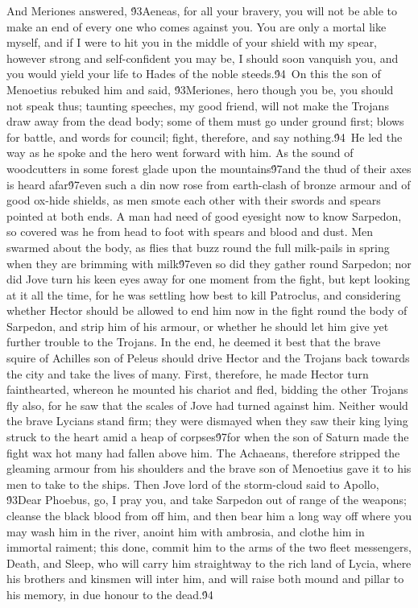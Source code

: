 {And Meriones answered, \'93Aeneas, for all your bravery, you will not be able to make an end of every one who comes against you. You are only a mortal like myself, and if I were to hit you in the middle of your shield with my spear, however strong and self-confident you may be, I should soon vanquish you, and you would yield your life to Hades of the noble steeds.\'94\
On this the son of Menoetius rebuked him and said, \'93Meriones, hero though you be, you should not speak thus; taunting speeches, my good friend, will not make the Trojans draw away from the dead body; some of them must go under ground first; blows for battle, and words for council; fight, therefore, and say nothing.\'94\
He led the way as he spoke and the hero went forward with him. As the sound of woodcutters in some forest glade upon the mountains\'97and the thud of their axes is heard afar\'97even such a din now rose from earth-clash of bronze armour and of good ox-hide shields, as men smote each other with their swords and spears pointed at both ends. A man had need of good eyesight now to know Sarpedon, so covered was he from head to foot with spears and blood and dust. Men swarmed about the body, as flies that buzz round the full milk-pails in spring when they are brimming with milk\'97even so did they gather round Sarpedon; nor did Jove turn his keen eyes away for one moment from the fight, but kept looking at it all the time, for he was settling how best to kill Patroclus, and considering whether Hector should be allowed to end him now in the fight round the body of Sarpedon, and strip him of his armour, or whether he should let him give yet further trouble to the Trojans. In the end, he deemed it best that the brave squire of Achilles son of Peleus should drive Hector and the Trojans back towards the city and take the lives of many. First, therefore, he made Hector turn fainthearted, whereon he mounted his chariot and fled, bidding the other Trojans fly also, for he saw that the scales of Jove had turned against him. Neither would the brave Lycians stand firm; they were dismayed when they saw their king lying struck to the heart amid a heap of corpses\'97for when the son of Saturn made the fight wax hot many had fallen above him. The Achaeans, therefore stripped the gleaming armour from his shoulders and the brave son of Menoetius gave it to his men to take to the ships. Then Jove lord of the storm-cloud said to Apollo, \'93Dear Phoebus, go, I pray you, and take Sarpedon out of range of the weapons; cleanse the black blood from off him, and then bear him a long way off where you may wash him in the river, anoint him with ambrosia, and clothe him in immortal raiment; this done, commit him to the arms of the two fleet messengers, Death, and Sleep, who will carry him straightway to the rich land of Lycia, where his brothers and kinsmen will inter him, and will raise both mound and pillar to his memory, in due honour to the dead.\'94\
}
